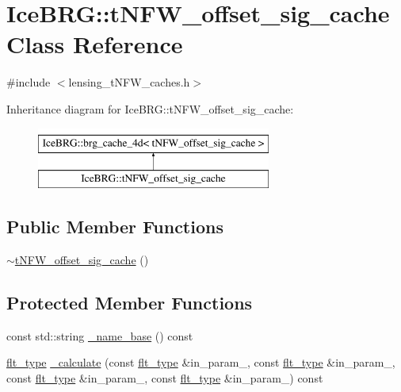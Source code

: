 \hypertarget{classIceBRG_1_1tNFW__offset__sig__cache}{\section{Ice\-B\-R\-G\-:\-:t\-N\-F\-W\-\_\-offset\-\_\-sig\-\_\-cache Class Reference}
\label{classIceBRG_1_1tNFW__offset__sig__cache}
}


{\ttfamily \#include $<$lensing\-\_\-t\-N\-F\-W\-\_\-caches.\-h$>$}

Inheritance diagram for Ice\-B\-R\-G\-:\-:t\-N\-F\-W\-\_\-offset\-\_\-sig\-\_\-cache\-:\begin{figure}[H]
\begin{center}
\leavevmode
\includegraphics[height=2.000000cm]{classIceBRG_1_1tNFW__offset__sig__cache}
\end{center}
\end{figure}
\subsection*{Public Member Functions}
\begin{DoxyCompactItemize}
\item 
\hyperlink{classIceBRG_1_1tNFW__offset__sig__cache_ae6477deb6a2e6449d4cce2a92053fc69}{$\sim$t\-N\-F\-W\-\_\-offset\-\_\-sig\-\_\-cache} ()
\end{DoxyCompactItemize}
\subsection*{Protected Member Functions}
\begin{DoxyCompactItemize}
\item 
const std\-::string \hyperlink{classIceBRG_1_1tNFW__offset__sig__cache_a93e0baf8668ed0e6f420e64ce5b0d105}{\-\_\-name\-\_\-base} () const 
\item 
\hyperlink{lib_2IceBRG__main_2common_8h_ad0f130a56eeb944d9ef2692ee881ecc4}{flt\-\_\-type} \hyperlink{classIceBRG_1_1tNFW__offset__sig__cache_a724eb5a7817521a54fbe7e7e01db1ac0}{\-\_\-calculate} (const \hyperlink{lib_2IceBRG__main_2common_8h_ad0f130a56eeb944d9ef2692ee881ecc4}{flt\-\_\-type} \&in\-\_\-param\-\_, const \hyperlink{lib_2IceBRG__main_2common_8h_ad0f130a56eeb944d9ef2692ee881ecc4}{flt\-\_\-type} \&in\-\_\-param\-\_, const \hyperlink{lib_2IceBRG__main_2common_8h_ad0f130a56eeb944d9ef2692ee881ecc4}{flt\-\_\-type} \&in\-\_\-param\-\_, const \hyperlink{lib_2IceBRG__main_2common_8h_ad0f130a56eeb944d9ef2692ee881ecc4}{flt\-\_\-type} \&in\-\_\-param\-\_) const 
\end{DoxyCompactItemize}
